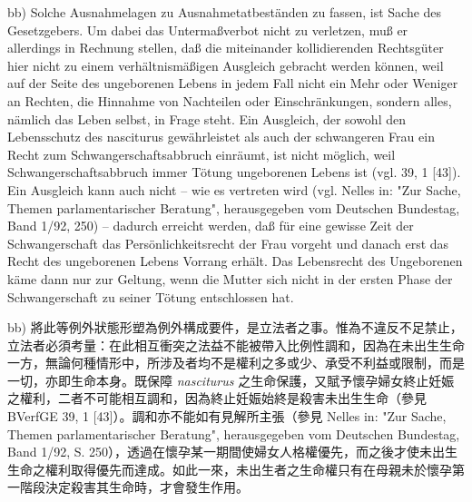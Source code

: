 \documentclass[12pt]{article}
\begin{document}
\begin{sourcepara}[title={原文D.49}]
bb) Solche Ausnahmelagen zu Ausnahmetatbeständen zu fassen, ist Sache des Gesetzgebers. Um dabei das Untermaßverbot nicht zu verletzen, muß er allerdings in Rechnung stellen, daß die miteinander kollidierenden Rechtsgüter hier nicht zu einem verhältnismäßigen Ausgleich gebracht werden können, weil auf der Seite des ungeborenen Lebens in jedem Fall nicht ein Mehr oder Weniger an Rechten, die Hinnahme von Nachteilen oder Einschränkungen, sondern alles, nämlich das Leben selbst, in Frage steht. Ein Ausgleich, der sowohl den Lebensschutz des nasciturus gewährleistet als auch der schwangeren Frau ein Recht zum Schwangerschaftsabbruch einräumt, ist nicht möglich, weil Schwangerschaftsabbruch immer Tötung ungeborenen Lebens ist (vgl. \abbrBVerfGE{} 39, 1 [43]). Ein Ausgleich kann auch nicht -- wie es vertreten wird (vgl. Nelles in: "Zur Sache, Themen parlamentarischer Beratung", herausgegeben vom Deutschen Bundestag, Band 1/92, \abbrS{} 250) -- dadurch erreicht werden, daß für eine gewisse Zeit der Schwangerschaft das Persönlichkeitsrecht der Frau vorgeht und danach erst das Recht des ungeborenen Lebens Vorrang erhält. Das Lebensrecht des Ungeborenen käme dann nur zur Geltung, wenn die Mutter sich nicht in der ersten Phase der Schwangerschaft zu seiner Tötung entschlossen hat.
\end{sourcepara}
\begin{transpara}
bb) 將此等例外狀態形塑為例外構成要件，是立法者之事。惟為不違反不足禁止，立法者必須考量：在此相互衝突之法益不能被帶入比例性調和，因為在未出生生命一方，無論何種情形中，所涉及者均不是權利之多或少、承受不利益或限制，而是一切，亦即生命本身。既保障 \textit{nasciturus} 之生命保護，又賦予懷孕婦女終止妊娠之權利，二者不可能相互調和，因為終止妊娠始終是殺害未出生生命（參見 BVerfGE 39, 1 [43]）。調和亦不能如有見解所主張（參見 Nelles in: "Zur Sache, Themen parlamentarischer Beratung", herausgegeben vom Deutschen Bundestag, Band 1/92, S. 250），透過在懷孕某一期間使婦女人格權優先，而之後才使未出生生命之權利取得優先而達成。如此一來，未出生者之生命權只有在母親未於懷孕第一階段決定殺害其生命時，才會發生作用。
\end{transpara}
\end{document}
